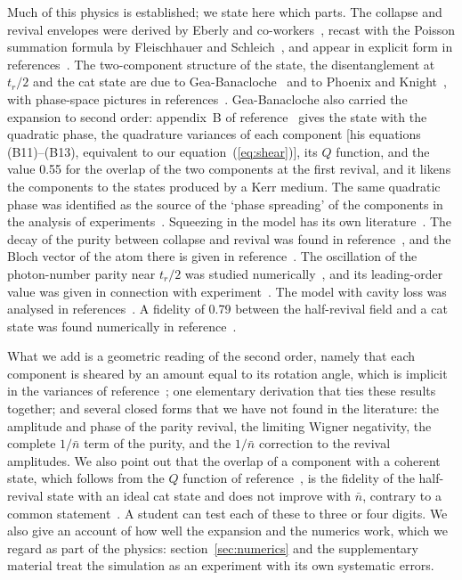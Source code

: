 \documentclass{iopjournal}
\newcommand{\nbar}{\bar{n}}
\begin{document}
Much of this physics is established; we state here which parts. The collapse and revival envelopes were derived by Eberly and co-workers~\cite{eberly1980, narozhny1981}, recast with the Poisson summation formula by Fleischhauer and Schleich~\cite{fleischhauer1993}, and appear in explicit form in references~\cite{feranchuk2009, pavlik2024}. The two-component structure of the state, the disentanglement at $t_r/2$ and the cat state are due to Gea-Banacloche~\cite{gea-banacloche1990, gea-banacloche1991} and to Phoenix and Knight~\cite{phoenix1991, phoenix1988}, with phase-space pictures in references~\cite{gea-banacloche1991, buzek1992, eiselt1991, larson2021, knight2024}. Gea-Banacloche also carried the expansion to second order: appendix~B of reference~\cite{gea-banacloche1991} gives the state with the quadratic phase, the quadrature variances of each component [his equations (B11)--(B13), equivalent to our equation~(\ref{eq:shear})], its $Q$ function, and the value 0.55 for the overlap of the two components at the first revival, and it likens the components to the states produced by a Kerr medium. The same quadratic phase was identified as the source of the `phase spreading' of the components in the analysis of experiments~\cite{auffeves2003, bild2023}. Squeezing in the model has its own literature~\cite{meystre1982, kuklinski1988, woods1993}. The decay of the purity between collapse and revival was found in reference~\cite{gea-banacloche1992}, and the Bloch vector of the atom there is given in reference~\cite{kennedy2010}. The oscillation of the photon-number parity near $t_r/2$ was studied numerically~\cite{knight2024, birrittella2015}, and its leading-order value was given in connection with experiment~\cite{assemat2019}. The model with cavity loss was analysed in references~\cite{gea-banacloche1993, meunier2006}. A fidelity of 0.79 between the half-revival field and a cat state was found numerically in reference~\cite{munhoz2005}.

What we add is a geometric reading of the second order, namely that each component is sheared by an amount equal to its rotation angle, which is implicit in the variances of reference~\cite{gea-banacloche1991}; one elementary derivation that ties these results together; and several closed forms that we have not found in the literature: the amplitude and phase of the parity revival, the limiting Wigner negativity, the complete $1/\nbar$ term of the purity, and the $1/\nbar$ correction to the revival amplitudes. We also point out that the overlap of a component with a coherent state, which follows from the $Q$ function of reference~\cite{gea-banacloche1991}, is the fidelity of the half-revival state with an ideal cat state and does not improve with $\nbar$, contrary to a common statement~\cite{larson2021}. A student can test each of these to three or four digits. We also give an account of how well the expansion and the numerics work, which we regard as part of the physics: section~\ref{sec:numerics} and the supplementary material treat the simulation as an experiment with its own systematic errors.
\end{document}
